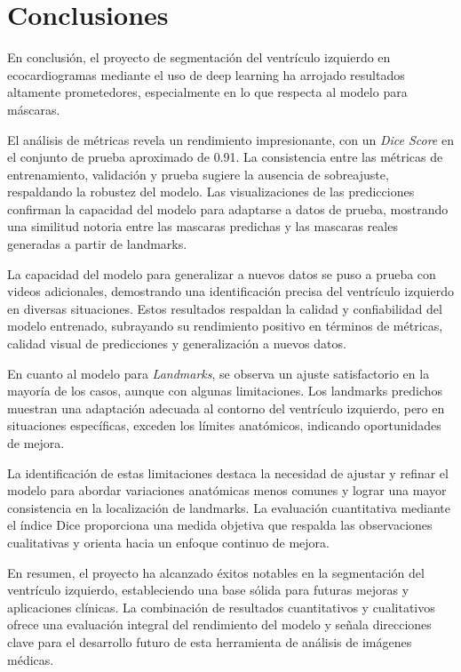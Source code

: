 \documentclass[runningheads]{llncs}
\begin{document}
\section{Conclusiones}

En conclusión, el proyecto de segmentación del ventrículo izquierdo en ecocardiogramas mediante el uso de deep learning ha arrojado resultados altamente prometedores, especialmente en lo que respecta al modelo para máscaras.

El análisis de métricas revela un rendimiento impresionante, con un \textit{Dice Score} en el conjunto de prueba aproximado de 0.91. La consistencia entre las métricas de entrenamiento, validación y prueba sugiere la ausencia de sobreajuste, respaldando la robustez del modelo. Las visualizaciones de las predicciones confirman la capacidad del modelo para adaptarse a datos de prueba, mostrando una similitud notoria entre las mascaras predichas y las mascaras reales generadas a partir de landmarks.

La capacidad del modelo para generalizar a nuevos datos se puso a prueba con videos adicionales, demostrando una identificación precisa del ventrículo izquierdo en diversas situaciones. Estos resultados respaldan la calidad y confiabilidad del modelo entrenado, subrayando su rendimiento positivo en términos de métricas, calidad visual de predicciones y generalización a nuevos datos.

En cuanto al modelo para \textit{Landmarks}, se observa un ajuste satisfactorio en la mayoría de los casos, aunque con algunas limitaciones. Los landmarks predichos muestran una adaptación adecuada al contorno del ventrículo izquierdo, pero en situaciones específicas, exceden los límites anatómicos, indicando oportunidades de mejora.

La identificación de estas limitaciones destaca la necesidad de ajustar y refinar el modelo para abordar variaciones anatómicas menos comunes y lograr una mayor consistencia en la localización de landmarks. La evaluación cuantitativa mediante el índice Dice proporciona una medida objetiva que respalda las observaciones cualitativas y orienta hacia un enfoque continuo de mejora.

En resumen, el proyecto ha alcanzado éxitos notables en la segmentación del ventrículo izquierdo, estableciendo una base sólida para futuras mejoras y aplicaciones clínicas. La combinación de resultados cuantitativos y cualitativos ofrece una evaluación integral del rendimiento del modelo y señala direcciones clave para el desarrollo futuro de esta herramienta de análisis de imágenes médicas.
\end{document}

